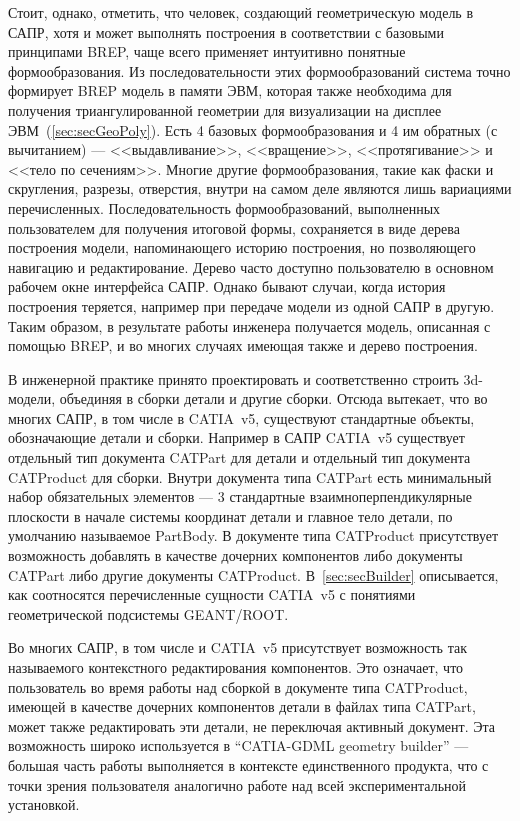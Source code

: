 Стоит, однако, отметить, что человек, создающий геометрическую модель в САПР, хотя и может выполнять построения в соответствии с базовыми принципами BREP, чаще всего применяет интуитивно понятные формообразования. Из последовательности этих формообразований система точно формирует BREP модель в памяти ЭВМ, которая также необходима для получения триангулированной геометрии для визуализации на дисплее ЭВМ~(\ref{sec:secGeoPoly}). Есть 4 базовых формообразования и 4 им обратных (с вычитанием) --- <<выдавливание>>, <<вращение>>, <<протягивание>> и <<тело по сечениям>>. Многие другие формообразования, такие как фаски и скругления, разрезы, отверстия, внутри на самом деле являются лишь вариациями перечисленных. Последовательность формообразований, выполненных пользователем для получения итоговой формы, сохраняется в виде дерева построения модели, напоминающего историю построения, но позволяющего навигацию и редактирование. Дерево часто доступно пользователю в основном рабочем окне интерфейса САПР. Однако бывают случаи, когда история построения теряется, например при передаче модели из одной САПР в другую. Таким образом, в результате работы инженера получается модель, описанная с помощью BREP, и во многих случаях имеющая также и дерево построения.


В инженерной практике принято проектировать и соответственно строить 3d-модели, объединяя в сборки детали и другие сборки. Отсюда вытекает, что во многих САПР, в том числе в CATIA~v5, существуют стандартные объекты, обозначающие детали и сборки. Например в САПР CATIA~v5 существует отдельный тип документа CATPart для детали и отдельный тип документа CATProduct для сборки. Внутри документа типа CATPart есть минимальный набор обязательных элементов --- 3 стандартные взаимноперпендикулярные плоскости в начале системы координат детали и главное тело детали, по умолчанию называемое PartBody. В документе типа CATProduct присутствует возможность добавлять в качестве дочерних компонентов либо документы CATPart либо другие документы CATProduct. В~\ref{sec:secBuilder} описывается, как соотносятся перечисленные сущности CATIA~v5 с понятиями геометрической подсистемы GEANT/ROOT.

Во многих САПР, в том числе и CATIA~v5 присутствует возможность так называемого контекстного редактирования компонентов. Это означает, что пользователь во время работы над сборкой в документе типа CATProduct, имеющей в качестве дочерних компонентов детали в файлах типа CATPart, может также редактировать эти детали, не переключая активный документ. Эта возможность широко используется в ``CATIA-GDML geometry builder'' --- большая часть работы выполняется в контексте единственного продукта, что с точки зрения пользователя аналогично работе над всей экспериментальной установкой.

